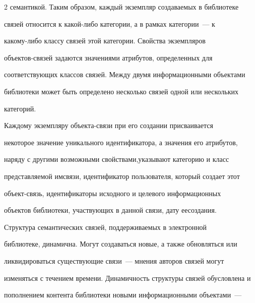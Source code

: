 \begin{multicols}{2}
семантикой. Таким образом, каждый экземпляр со\-зда\-ва\-емых в библиотеке 


связей относится к ка\-кой-ли\-бо категории, а в рамках категории~--- к 


  ка\-ко\-му-ли\-бо классу связей этой категории. Свойства экземпляров 


  объек\-тов-свя\-зей задаются значениями атрибутов, определенных для 


соответствующих классов связей. Между двумя информационными объектами 


библиотеки может быть определено несколько связей одной или нескольких 


категорий.


{ %





}


  


  Каждому экземпляру объекта-связи при его создании присваивается 


некоторое значение уникального идентификатора, а значения его атрибутов, 


наряду с другими возможными свойствами,\linebreak указывают категорию и класс 


представляемой им\linebreak связи, идентификатор пользователя, который создает этот 


объект-связь, идентификаторы исходного и целевого информационных 


объектов биб\-лио\-теки, участвующих в данной связи, дату ее\linebreak со\-здания.


{ %





}


  


  Структура семантических связей, под\-дер\-жи\-ва\-емых в электронной 


библиотеке, динамична. Могут создаваться новые, а также обновляться или 


ликвидироваться существующие связи~--- мнения авторов связей могут 


изменяться с течением времени. Динамичность структуры связей обусловлена и 


пополнением контента библиотеки новыми информационными объектами~--- 



\end{multicols}

